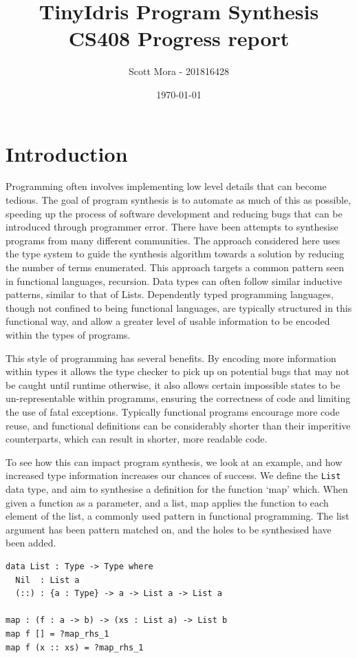 \documentclass[a4paper]{article}
\author{Scott Mora - 201816428}
\date{\today}
\title{TinyIdris Program Synthesis\\\medskip
\large CS408 Progress report}
\begin{document}
\maketitle


\section{Introduction}
\label{sec:org8ec809c}

Programming often involves implementing low level details that can become
tedious. The goal of program synthesis is to automate as much of this as
possible, speeding up the process of software development and reducing
bugs that can be introduced through programmer error. There have been
attempts to synthesise programs from many different communities.
The approach considered here uses the type system to guide the synthesis
algorithm towards a solution by reducing the number of terms enumerated.
This approach targets a common pattern seen in functional languages,
recursion. Data types can often follow similar inductive patterns, 
similar to that of Lists. Dependently typed programming languages, 
though not confined to being functional languages, are typically 
structured in this functional way, and allow a greater level of usable 
information to be encoded within the types of programs. 

This style of programming has several benefits. By encoding more 
information within types it allows the type checker to pick up on 
potential bugs that may not be caught until runtime otherwise, it also 
allows certain impossible states to be un-representable within programms,
ensuring the correctness of code and limiting the use of fatal 
exceptions. Typically functional programs encourage more code reuse,
and functional definitions can be considerably shorter than their 
imperitive counterparts, which can result in shorter, more readable code.

To see how this can impact program synthesis, we look at an example, 
and how increased type information increases our chances of success. 
We define the \texttt{List} data type, and aim to synthesise a definition for
the function `map' which. When given a function as a parameter, and a 
list, map applies the function to each element of the list, a commonly 
used pattern in functional programming. The list argument has been
pattern matched on, and the holes to be synthesised have been added.

\begin{center}
\begin{verbatim}
data List : Type -> Type where
  Nil  : List a
  (::) : {a : Type} -> a -> List a -> List a

map : (f : a -> b) -> (xs : List a) -> List b 
map f [] = ?map_rhs_1
map f (x :: xs) = ?map_rhs_1
\end{verbatim}
\end{center}
\end{document}
